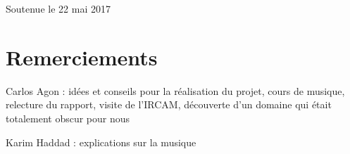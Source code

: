 \documentclass[a4paper,12pt]{article}
\begin{document}
\begin{titlepage}
\begin{center}
\vspace*{2cm}

{\large Soutenue le 22 mai 2017}\\[1cm]

\vfill

\end{center}
\end{titlepage}


\newpage\null\thispagestyle{empty}\newpage


\tableofcontents

\newpage\null\thispagestyle{empty}\newpage



\section{Remerciements}

Carlos Agon : idées et conseils pour la réalisation du projet, cours de musique, relecture du rapport, visite de l'IRCAM, découverte d'un domaine qui était totalement obscur pour nous

\par
Karim Haddad : explications sur la musique


\newpage\null\thispagestyle{empty}\newpage



\listoffigures %

\newpage\null\thispagestyle{empty}\newpage









\pagestyle{fancy}










%





\nocite{*}
\end{document}
